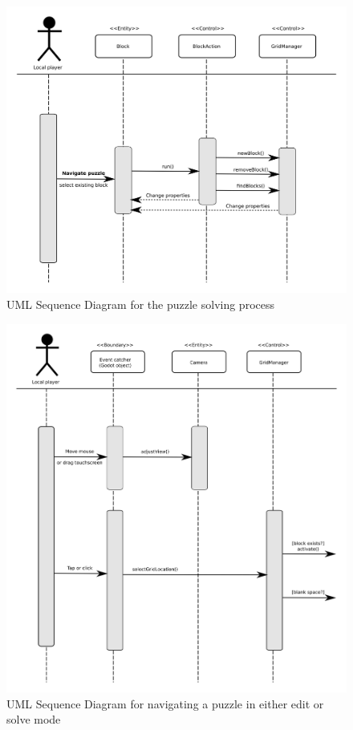 \documentclass[12pt]{article}
\begin{document}
    \begin{figure}[H]
        \centering
        \includegraphics[width=6in]{sequence_solve.png}
        \caption{UML Sequence Diagram for the puzzle solving process}
    \end{figure}


    \begin{figure}[H]
        \centering
        \includegraphics[width=6in]{sequence_navigate_puzzle.png}
        \caption{UML Sequence Diagram for navigating a puzzle in either edit or
        solve mode}
    \end{figure}
\end{document}
